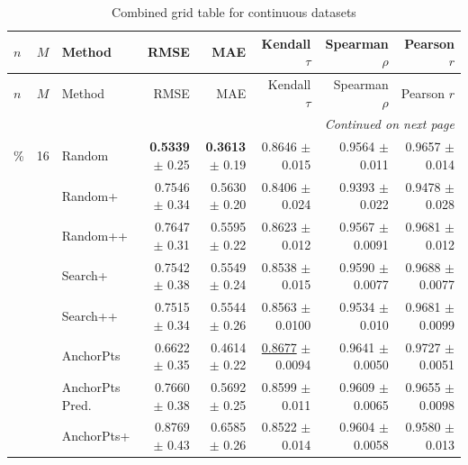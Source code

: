 \footnotesize
\setlength{\tabcolsep}{2pt}
\renewcommand{\arraystretch}{1.05}
\setlength{\LTpre}{0pt}
\setlength{\LTpost}{0pt}
\setlength{\LTleft}{\fill}
\setlength{\LTright}{\fill}
\begin{longtable}{llp{}rrrrr}
\caption{Combined grid table for continuous datasets}\label{tab:combined\_grid\_continuous}\\
\toprule
$n$ & $M$ & Method & RMSE & MAE & Kendall $\tau$ & Spearman $\rho$ & Pearson $r$ \\
\midrule
\endfirsthead
\toprule
$n$ & $M$ & Method & RMSE & MAE & Kendall $\tau$ & Spearman $\rho$ & Pearson $r$ \\
\midrule
\endhead
\midrule
\multicolumn{8}{r}{\emph{Continued on next page}} \\
\midrule
\endfoot
\bottomrule
\endlastfoot
5\% & 16 & Random & \textbf{0.5339} {\scriptsize $\pm$ 0.25} & \textbf{0.3613} {\scriptsize $\pm$ 0.19} & 0.8646 {\scriptsize $\pm$ 0.015} & 0.9564 {\scriptsize $\pm$ 0.011} & 0.9657 {\scriptsize $\pm$ 0.014} \\
 &  & Random+ & 0.7546 {\scriptsize $\pm$ 0.34} & 0.5630 {\scriptsize $\pm$ 0.20} & 0.8406 {\scriptsize $\pm$ 0.024} & 0.9393 {\scriptsize $\pm$ 0.022} & 0.9478 {\scriptsize $\pm$ 0.028} \\
 &  & Random++ & 0.7647 {\scriptsize $\pm$ 0.31} & 0.5595 {\scriptsize $\pm$ 0.22} & 0.8623 {\scriptsize $\pm$ 0.012} & 0.9567 {\scriptsize $\pm$ 0.0091} & 0.9681 {\scriptsize $\pm$ 0.012} \\
 &  & Search+ & 0.7542 {\scriptsize $\pm$ 0.38} & 0.5549 {\scriptsize $\pm$ 0.24} & 0.8538 {\scriptsize $\pm$ 0.015} & 0.9590 {\scriptsize $\pm$ 0.0077} & 0.9688 {\scriptsize $\pm$ 0.0077} \\
 &  & Search++ & 0.7515 {\scriptsize $\pm$ 0.34} & 0.5544 {\scriptsize $\pm$ 0.26} & 0.8563 {\scriptsize $\pm$ 0.0100} & 0.9534 {\scriptsize $\pm$ 0.010} & 0.9681 {\scriptsize $\pm$ 0.0099} \\
 &  & AnchorPts & 0.6622 {\scriptsize $\pm$ 0.35} & 0.4614 {\scriptsize $\pm$ 0.22} & \underline{0.8677} {\scriptsize $\pm$ 0.0094} & 0.9641 {\scriptsize $\pm$ 0.0050} & 0.9727 {\scriptsize $\pm$ 0.0051} \\
 &  & AnchorPts Pred. & 0.7660 {\scriptsize $\pm$ 0.38} & 0.5692 {\scriptsize $\pm$ 0.25} & 0.8599 {\scriptsize $\pm$ 0.011} & 0.9609 {\scriptsize $\pm$ 0.0065} & 0.9655 {\scriptsize $\pm$ 0.0098} \\
 &  & AnchorPts+ & 0.8769 {\scriptsize $\pm$ 0.43} & 0.6585 {\scriptsize $\pm$ 0.26} & 0.8522 {\scriptsize $\pm$ 0.014} & 0.9604 {\scriptsize $\pm$ 0.0058} & 0.9580 {\scriptsize $\pm$ 0.013} \\

\end{longtable}
